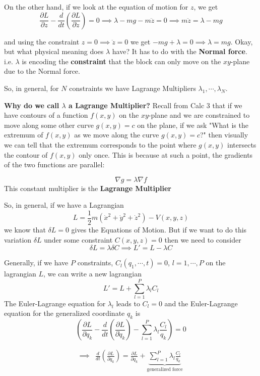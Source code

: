 \documentclass[11pt]{article}
\begin{document}
On the other hand, if we look at the equation of motion for $z$, we get 
\[  \frac{\partial L}{\partial z} - \frac{d}{dt} \left(\frac{\partial L}{\partial \dot{z}}\right) = 0 \implies \lambda - mg - m\ddot{z} = 0 \implies m\ddot{z} = \lambda - mg \]

and using the constraint $z = 0 \implies \ddot{z} = 0$ we get $-mg + \lambda = 0 \implies \lambda = mg$. Okay, but what physical meaning does $\lambda$ have? It has to do with the \textbf{Normal force}. i.e. $\lambda$ is encoding the \textbf{constraint} that the block can only move on the $xy$-plane due to the Normal force. 

\begin{redbox}
  So, in general, for $N$ constraints we have Lagrange Multipliers $\lambda_1, \cdots, \lambda_N$.
\end{redbox}

\begin{bluebox}
  \textbf{Why do we call $\lambda$ a Lagrange Multiplier?}
  \vskip 0.5cm
  Recall from Calc 3 that if we have contours of a function $f(x,y)$ on the $xy$-plane and we are constrained to move along some other curve $g(x,y) = c$ on the plane, if we ask 
  \color{blue}
  "What is the extremum of $f(x,y)$ as we move along the curve $g(x,y) = c$?"
  \color{black} then visually we can tell that the extremum corresponds to the point where $g(x,y)$ intersects the contour of $f(x,y)$ only once. This is because at such a point, the gradients of the two functions are parallel:

  \[ \nabla g = \lambda \nabla f \]
  This constant multiplier is the \textbf{Lagrange Multiplier}
\end{bluebox}

So, in general, if we have a Lagrangian 
\[ L = \frac{1}{2}m \left(\dot{x}^2 + \dot{y}^2 + \dot{z}^2\right) - V(x,y,z) \]
we know that $\delta L = 0$ gives the Equations of Motion. But if we want to do this variation $\delta L$ under some constraint $C(x,y,z) = 0$ then we need to consider 
\[ \delta L = \lambda \delta C \implies L' = L - \lambda C \]


\vskip 0.5cm
\begin{redbox}
  Generally, if we have $P$ constraints, $C_{l}(q_1, \cdots, t) = 0$, $l = 1, \cdots, P$ on the lagrangian $L$, we can write a new lagrangian 
  \[ L' = L + \sum_{l = 1}^{P} \lambda_l C_l \]
  The Euler-Lagrange equation for $\lambda_l$ leads to $C_l = 0$ and the Euler-Lagrange equation for the generalized coordinate $q_k$ is 
  \[ \left( \frac{\partial L }{\partial q_{k}} - \frac{d}{dt} \left( \frac{\partial L}{\partial \dot{q}_{k}} \right) - \sum_{l = 1}^{P} \lambda_l \frac{C_l}{q_k} \right) = 0 \] 

  \begin{align*}
    \implies& \frac{d}{dt} \left( \frac{\partial L}{\partial \dot{q}_{k}} \right) = \frac{\partial L }{\partial q_{k}} + \underbrace{\sum_{l = 1}^{P} \lambda_l \frac{C_l}{q_k} }_{\text{generalized force}}
  \end{align*}
\end{redbox}
\end{document}
